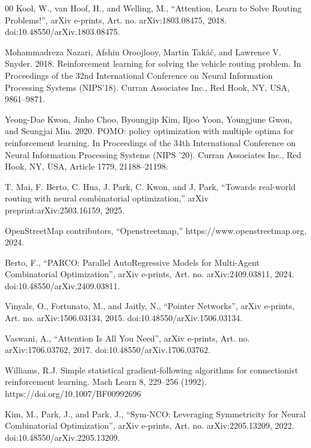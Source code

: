 \documentclass[journal,twoside,web]{ieeecolor}
\theoremstyle{definition}
\theoremstyle{remark}
\theoremstyle{definition}
\begin{document}
\begin{thebibliography}{00}
Kool, W., van Hoof, H., and Welling, M., “Attention, Learn to Solve Routing Problems!”, arXiv e-prints, Art. no. arXiv:1803.08475, 2018. doi:10.48550/arXiv.1803.08475.

Mohammadreza Nazari, Afshin Oroojlooy, Martin Takáč, and Lawrence V. Snyder. 2018. Reinforcement learning for solving the vehicle routing problem. In Proceedings of the 32nd International Conference on Neural Information Processing Systems (NIPS'18). Curran Associates Inc., Red Hook, NY, USA, 9861–9871.

Yeong-Dae Kwon, Jinho Choo, Byoungjip Kim, Iljoo Yoon, Youngjune Gwon, and Seungjai Min. 2020. POMO: policy optimization with multiple optima for reinforcement learning. In Proceedings of the 34th International Conference on Neural Information Processing Systems (NIPS '20). Curran Associates Inc., Red Hook, NY, USA, Article 1779, 21188–21198.

T. Mai, F. Berto, C. Hua, J. Park, C. Kwon, and J. Park, “Towards real-world routing with neural combinatorial optimization,” arXiv preprint:arXiv:2503.16159, 2025.

OpenStreetMap contributors, “Openstreetmap,” https://www.openstreetmap.org, 2024.

Berto, F., “PARCO: Parallel AutoRegressive Models for Multi-Agent Combinatorial Optimization”, arXiv e-prints, Art. no. arXiv:2409.03811, 2024. doi:10.48550/arXiv.2409.03811.

Vinyals, O., Fortunato, M., and Jaitly, N., “Pointer Networks”, arXiv e-prints, Art. no. arXiv:1506.03134, 2015. doi:10.48550/arXiv.1506.03134.

Vaswani, A., “Attention Is All You Need”, arXiv e-prints, Art. no. arXiv:1706.03762, 2017. doi:10.48550/arXiv.1706.03762.

Williams, R.J. Simple statistical gradient-following algorithms for connectionist reinforcement learning. Mach Learn 8, 229–256 (1992). https://doi.org/10.1007/BF00992696

Kim, M., Park, J., and Park, J., “Sym-NCO: Leveraging Symmetricity for Neural Combinatorial Optimization”, arXiv e-prints, Art. no. arXiv:2205.13209, 2022. doi:10.48550/arXiv.2205.13209.


\end{thebibliography}
\end{document}

